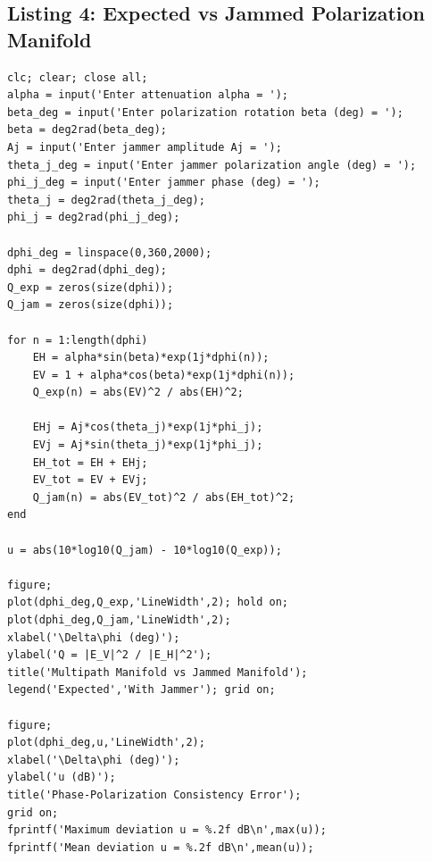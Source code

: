 \documentclass{article}
\begin{document}
\subsection{Listing 4: Expected vs Jammed Polarization Manifold}\label{lst:poljammed}
\begin{verbatim}
clc; clear; close all;
alpha = input('Enter attenuation alpha = ');
beta_deg = input('Enter polarization rotation beta (deg) = ');
beta = deg2rad(beta_deg);
Aj = input('Enter jammer amplitude Aj = ');
theta_j_deg = input('Enter jammer polarization angle (deg) = ');
phi_j_deg = input('Enter jammer phase (deg) = ');
theta_j = deg2rad(theta_j_deg);
phi_j = deg2rad(phi_j_deg);

dphi_deg = linspace(0,360,2000);
dphi = deg2rad(dphi_deg);
Q_exp = zeros(size(dphi));
Q_jam = zeros(size(dphi));

for n = 1:length(dphi)
    EH = alpha*sin(beta)*exp(1j*dphi(n));
    EV = 1 + alpha*cos(beta)*exp(1j*dphi(n));
    Q_exp(n) = abs(EV)^2 / abs(EH)^2;

    EHj = Aj*cos(theta_j)*exp(1j*phi_j);
    EVj = Aj*sin(theta_j)*exp(1j*phi_j);
    EH_tot = EH + EHj;
    EV_tot = EV + EVj;
    Q_jam(n) = abs(EV_tot)^2 / abs(EH_tot)^2;
end

u = abs(10*log10(Q_jam) - 10*log10(Q_exp));

figure;
plot(dphi_deg,Q_exp,'LineWidth',2); hold on;
plot(dphi_deg,Q_jam,'LineWidth',2);
xlabel('\Delta\phi (deg)');
ylabel('Q = |E_V|^2 / |E_H|^2');
title('Multipath Manifold vs Jammed Manifold');
legend('Expected','With Jammer'); grid on;

figure;
plot(dphi_deg,u,'LineWidth',2);
xlabel('\Delta\phi (deg)');
ylabel('u (dB)');
title('Phase-Polarization Consistency Error');
grid on;
fprintf('Maximum deviation u = %.2f dB\n',max(u));
fprintf('Mean deviation u = %.2f dB\n',mean(u));
\end{verbatim}
\end{document}
